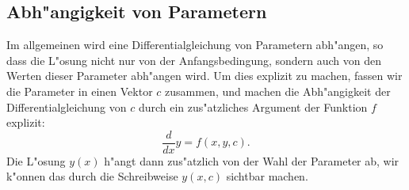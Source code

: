 %

\subsection{Abh"angigkeit von Parametern}
Im allgemeinen wird eine Differentialgleichung von Parametern abh"angen,
so dass die L"osung nicht nur von der Anfangsbedingung, sondern auch von den
Werten dieser Parameter abh"angen wird.
Um dies explizit zu machen, fassen wir die Parameter in einen Vektor $c$
zusammen, und machen die Abh"angigkeit der Differentialgleichung
von $c$ durch ein zus"atzliches Argument der Funktion $f$ explizit:
\[
\frac{d}{dx}y = f(x,y,c).
\]
Die L"osung $y(x)$ h"angt dann zus"atzlich von der Wahl der Parameter
ab, wir k"onnen das durch die Schreibweise $y(x,c)$ sichtbar machen.


